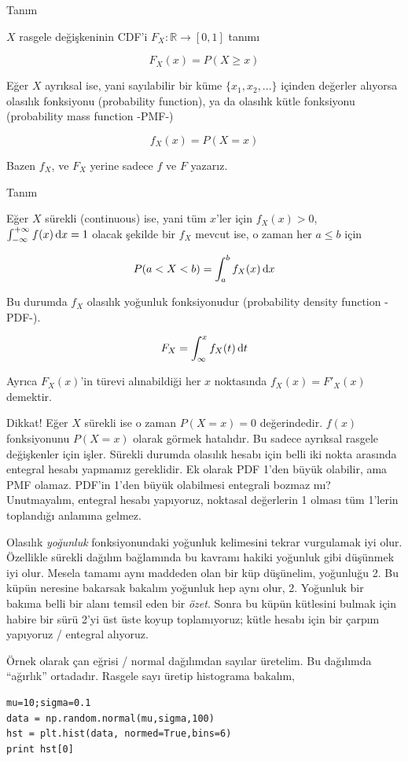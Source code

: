 \documentclass[12pt,fleqn]{article}\usepackage{../../common}
\begin{document}
Tanım

$X$ rasgele değişkeninin CDF'i $F_X: \mathbb{R} \to [0,1]$ tanımı

$$ F_X(x) = P(X \ge x) $$

Eğer $X$ ayrıksal ise, yani sayılabilir bir küme $\{x_1,x_2,...\}$ içinden
değerler alıyorsa olasılık fonksiyonu (probability function), ya da olasılık
kütle fonksiyonu (probability mass function -PMF-)

$$ f_X(x) = P(X = x) $$

Bazen $f_X$, ve $F_X$ yerine sadece $f$ ve $F$ yazarız.

Tanım

Eğer $X$ sürekli (continuous) ise, yani tüm $x$'ler için $f_X(x) > 0$,
$\int_{-\infty}^{+\infty}f(x) \,\mathrm{d} x = 1$ olacak şekilde bir $f_X$ mevcut ise, o
zaman her $a \le b$ için

$$ P(a<X<b) = \int_{a}^{b}f_X(x) \,\mathrm{d} x $$

Bu durumda $f_X$ olasılık yoğunluk fonksiyonudur (probability density function
-PDF-). 

$$ F_X = \int_{\infty}^{x}f_X(t) \,\mathrm{d} t $$

Ayrıca $F_X(x)$'in türevi alınabildiği her $x$ noktasında  $f_X(x) = F'_X(x)$
demektir. 

Dikkat! Eğer $X$ sürekli ise o zaman $P(X = x) = 0$ değerindedir. $f(x)$
fonksiyonunu $P(X=x)$ olarak görmek hatalıdır. Bu sadece ayrıksal rasgele
değişkenler için işler. Sürekli durumda olasılık hesabı için belli iki
nokta arasında entegral hesabı yapmamız gereklidir. Ek olarak PDF 1'den
büyük olabilir, ama PMF olamaz. PDF'in 1'den büyük olabilmesi entegrali
bozmaz mı? Unutmayalım, entegral hesabı yapıyoruz, noktasal değerlerin 1
olması tüm 1'lerin toplandığı anlamına gelmez. 

Olasılık {\em yoğunluk} fonksiyonundaki yoğunluk kelimesini tekrar
vurgulamak iyi olur. Özellikle sürekli dağılım bağlamında bu kavramı hakiki
yoğunluk gibi düşünmek iyi olur. Mesela tamamı aynı maddeden olan bir küp
düşünelim, yoğunluğu 2. Bu küpün neresine bakarsak bakalım yoğunluk hep
aynı olur, 2. Yoğunluk bir bakıma belli bir alanı temsil eden bir
{\em özet}. Sonra bu küpün kütlesini bulmak için habire bir sürü 2'yi üst üste
koyup toplamıyoruz; kütle hesabı için bir çarpım yapıyoruz / entegral
alıyoruz.

Örnek olarak çan eğrisi / normal dağılımdan sayılar üretelim. Bu dağılımda
``ağırlık'' ortadadır. Rasgele sayı üretip histograma bakalım,

\begin{verbatim}
mu=10;sigma=0.1
data = np.random.normal(mu,sigma,100)
hst = plt.hist(data, normed=True,bins=6)
print hst[0]
\end{verbatim}
\end{document}
